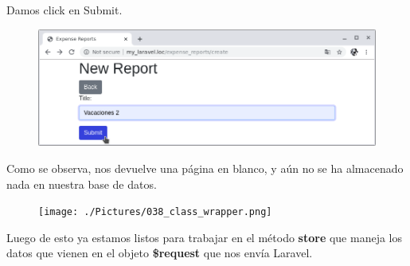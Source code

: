 \documentclass{article}
\begin{document}
Damos click en Submit.

\begin{figure}[h!]
  \centering
  \includegraphics[scale=0.5]{./Pictures/062_submit_again.png}
\end{figure}

Como se observa, nos devuelve una página en blanco, y aún no se ha almacenado
nada en nuestra base de datos.\\

\begin{figure}[h!]
  \centering
  \texttt{[image: ./Pictures/038\_class\_wrapper.png]}
\end{figure}

Luego de esto ya estamos listos para trabajar en el método \textbf{store} que
maneja los datos que vienen en el objeto \textbf{\$request} que nos envía
Laravel.\\
\end{document}
